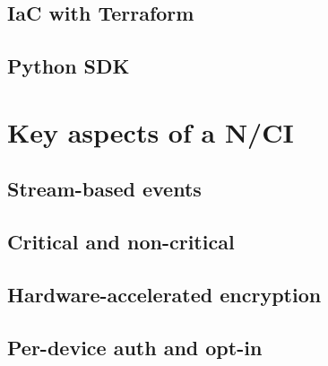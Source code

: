
\subsection{IaC with Terraform}
\label{chapter4-iac-with-terraform}

\subsection{Python SDK}
\label{chapter4-python-sdk}

\section{Key aspects of a N/CI}
\label{chapter4-key-aspects}

\subsection{Stream-based events}
\label{chapter4-stream-based-events}

\subsection{Critical and non-critical}
\label{chapter4-critical-and-non-critical}

\subsection{Hardware-accelerated encryption}
\label{chapter4-hardware-accelerated-encryption}

\subsection{Per-device auth and opt-in}
\label{chapter4-user-side-opt-in}

